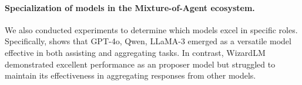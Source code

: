 \documentclass{article}
\begin{document}








\paragraph{Specialization of models in the Mixture-of-Agent ecosystem.}
We also conducted experiments to determine which models excel in specific roles.
Specifically,  shows that GPT-4o, Qwen, LLaMA-3 emerged as a versatile model effective in both assisting and aggregating tasks.
In contrast, WizardLM demonstrated excellent performance as an proposer model 
but struggled to maintain its effectiveness in aggregating responses from other models.
\end{document}
